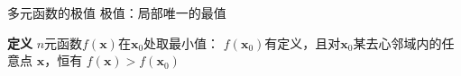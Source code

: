 \begin{frame}{多元函数的极值}
	\linespread{1.2}
	{\bb 极值：}局部唯一的最值
	\begin{block}{{\bf 定义}\hfill}
		{\bb $n$元函数$f(\bm{x})$在$\bm{x}_0$处取最小值：}
		$f(\bm{x}_0)$有定义，且对$\bm{x}_0$某去心邻域内的任意点
		$\bm{x}$，恒有
		$f(\bm{x})>f(\bm{x}_0)$
	\end{block}
	{\begin{center}
	\end{center}}
\end{frame}

